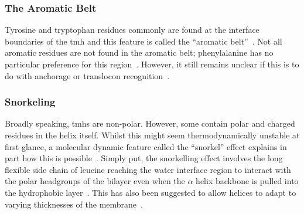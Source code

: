 \subsubsection{The Aromatic Belt}

 Tyrosine and tryptophan residues commonly are found at the interface boundaries of the \gls{tmh} and this feature is called the ``aromatic belt''~\cite{Hessa2005, Granseth2005, Sharpe2010, Baeza-Delgado2013, Nilsson2005}. Not all aromatic residues are not found in the aromatic belt; phenylalanine has no particular preference for this region~\cite{Granseth2005, Braun1999}. However, it still remains unclear if this is to do with anchorage or translocon recognition~\cite{Baeza-Delgado2013}.


\subsubsection{Snorkeling}

Broadly speaking, \gls{tmh}s are non-polar. However, some contain polar and charged residues in the helix itself. Whilst this might seem thermodynamically unstable at first glance, a molecular dynamic feature called the ``snorkel'' effect explains in part how this is possible~\cite{Chamberlain2004, Strandberg2003}. Simply put, the snorkelling effect involves the long flexible side chain of leucine reaching the water interface region to interact with the polar headgroups of the bilayer even when the $\alpha$ helix backbone is pulled into the hydrophobic layer~\cite{Krishnakumar2007}. This has also been suggested to allow helices to adapt to varying thicknesses of the membrane~\cite{Kandasamy2006}.


